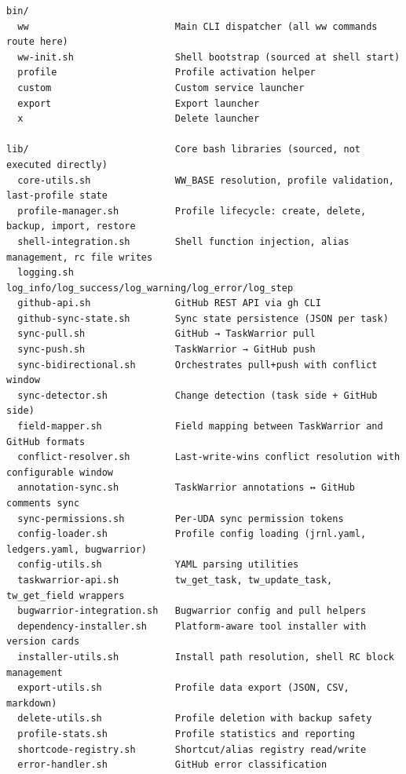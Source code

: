 \documentclass[
]{article}
\begin{document}
\begin{verbatim}
bin/
  ww                          Main CLI dispatcher (all ww commands route here)
  ww-init.sh                  Shell bootstrap (sourced at shell start)
  profile                     Profile activation helper
  custom                      Custom service launcher
  export                      Export launcher
  x                           Delete launcher

lib/                          Core bash libraries (sourced, not executed directly)
  core-utils.sh               WW_BASE resolution, profile validation, last-profile state
  profile-manager.sh          Profile lifecycle: create, delete, backup, import, restore
  shell-integration.sh        Shell function injection, alias management, rc file writes
  logging.sh                  log_info/log_success/log_warning/log_error/log_step
  github-api.sh               GitHub REST API via gh CLI
  github-sync-state.sh        Sync state persistence (JSON per task)
  sync-pull.sh                GitHub → TaskWarrior pull
  sync-push.sh                TaskWarrior → GitHub push
  sync-bidirectional.sh       Orchestrates pull+push with conflict window
  sync-detector.sh            Change detection (task side + GitHub side)
  field-mapper.sh             Field mapping between TaskWarrior and GitHub formats
  conflict-resolver.sh        Last-write-wins conflict resolution with configurable window
  annotation-sync.sh          TaskWarrior annotations ↔ GitHub comments sync
  sync-permissions.sh         Per-UDA sync permission tokens
  config-loader.sh            Profile config loading (jrnl.yaml, ledgers.yaml, bugwarrior)
  config-utils.sh             YAML parsing utilities
  taskwarrior-api.sh          tw_get_task, tw_update_task, tw_get_field wrappers
  bugwarrior-integration.sh   Bugwarrior config and pull helpers
  dependency-installer.sh     Platform-aware tool installer with version cards
  installer-utils.sh          Install path resolution, shell RC block management
  export-utils.sh             Profile data export (JSON, CSV, markdown)
  delete-utils.sh             Profile deletion with backup safety
  profile-stats.sh            Profile statistics and reporting
  shortcode-registry.sh       Shortcut/alias registry read/write
  error-handler.sh            GitHub error classification


\end{verbatim}
\end{document}
